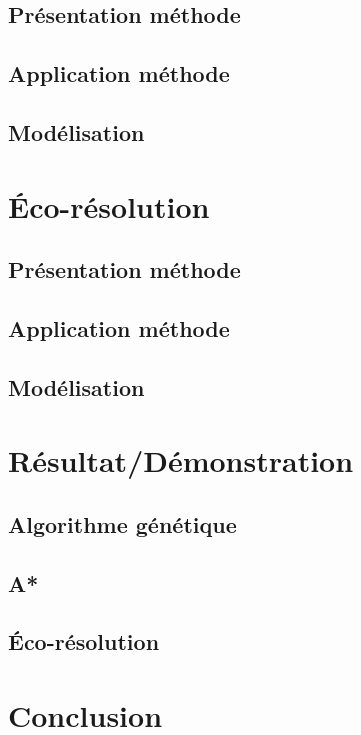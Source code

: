 \documentclass{beamer}
\begin{document}
        \subsection{Présentation méthode}
	        
	    \subsection{Application méthode}
        	
        \subsection{Modélisation}
        	
        	
    \section{Éco-résolution}
        \subsection{Présentation méthode}
	        
	    \subsection{Application méthode}
        	
        \subsection{Modélisation}
        	
        	
    \section{Résultat/Démonstration}
        \subsection{Algorithme génétique}
        	
        \subsection{A*}
        	
        \subsection{Éco-résolution}
        	
        	
    \section{Conclusion}
        \subsection{}
            
\end{document}

